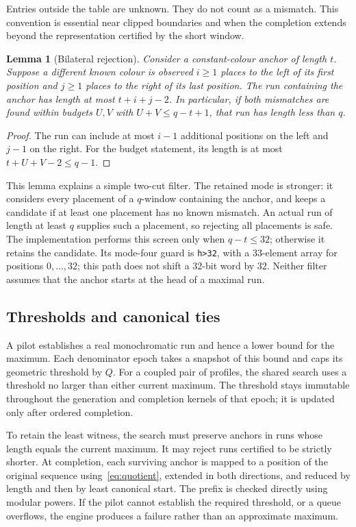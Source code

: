 \documentclass[11pt]{article}
\newtheorem{lemma}[theorem]{Lemma}
\theoremstyle{definition}\newtheorem{remark}[theorem]{Remark}
\begin{document}
Entries outside the table are unknown. They do not count as a mismatch.
This convention is essential near clipped boundaries and when the
completion extends beyond the representation certified by the short window.

\begin{lemma}[Bilateral rejection]\label{lem:cuts}
Consider a constant-colour anchor of length $t$. Suppose a different known
colour is observed $i\ge1$ places to the left of its first position and
$j\ge1$ places to the right of its last position. The run containing the
anchor has length at most $t+i+j-2$. In particular, if both mismatches are
found within budgets $U,V$ with $U+V\le q-t+1$, that run has length less
than $q$.
\end{lemma}
\begin{proof}
The run can include at most $i-1$ additional positions on the left and
$j-1$ on the right. For the budget statement, its length is at most
$t+U+V-2\le q-1$.
\end{proof}

This lemma explains a simple two-cut filter. The retained mode is stronger:
it considers every placement of a $q$-window containing the anchor, and
keeps a candidate if at least one placement has no known mismatch. An
actual run of length at least $q$ supplies such a placement, so rejecting
all placements is safe. The implementation performs this screen only when
$q-t\le32$; otherwise it retains the candidate. Its mode-four guard is
\texttt{h>32}, with a 33-element array for positions $0,\ldots,32$;
this path does not shift a 32-bit word by 32. Neither filter assumes that
the anchor starts at the head of a maximal run.

\subsection{Thresholds and canonical ties}
A pilot establishes a real monochromatic run and hence a lower bound for
the maximum. Each denominator epoch takes a snapshot of this bound and
caps its geometric threshold by $Q$. For a coupled pair of profiles, the
shared search uses a threshold no larger than either current maximum.
The threshold stays immutable throughout the generation and completion
kernels of that epoch; it is updated only after ordered completion.

To retain the least witness, the search must preserve anchors in runs whose
length equals the current maximum. It may reject runs certified to be
strictly shorter. At completion, each surviving anchor is mapped to a
position of the original sequence using~\eqref{eq:quotient}, extended in
both directions, and reduced by length and then by least canonical start.
The prefix is checked directly using modular powers. If the pilot cannot
establish the required threshold, or a queue overflows, the engine produces
a failure rather than an approximate maximum.
\end{document}
